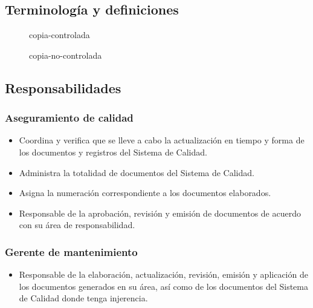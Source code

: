 \subsection{Terminología y definiciones}
\begin{description}
    \item[] \glsdesc{copia-controlada} 
    \item[] \glsdesc{copia-no-controlada} 
\end{description}

\subsection{Responsabilidades}
\subsubsection{Aseguramiento de calidad}
\begin{itemize}
    \item Coordina y verifica que se lleve a cabo la actualización en tiempo y forma de los documentos y registros del Sistema de Calidad.
    \item Administra la totalidad de documentos del Sistema de Calidad.
    \item Asigna la numeración correspondiente a los documentos elaborados.
    \item Responsable de la aprobación, revisión y emisión de documentos de acuerdo con su área de responsabilidad.
\end{itemize}

\subsubsection{Gerente de mantenimiento}
\begin{itemize}
    \item Responsable de la elaboración, actualización, revisión, emisión y aplicación de los documentos generados en su área, así como de los documentos del Sistema de Calidad donde tenga injerencia.
\end{itemize}

